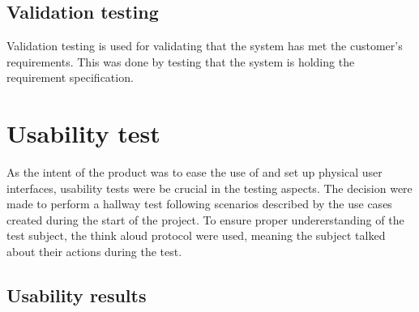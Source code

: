 		\subsection{Validation testing}
			Validation testing is used for validating that the system has met the customer's requirements. This was done by testing that the system is holding the requirement specification.

	\section{Usability test}
		As the intent of the product was to ease the use of and set up physical user interfaces, usability tests were be crucial in the testing aspects. The decision were made to perform a hallway test following scenarios described by the use cases created during the start of the project. To ensure proper undererstanding of the test subject, the think aloud protocol were used, meaning the subject talked about their actions during the test.

		\subsection{Usability results}
